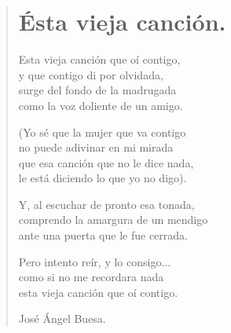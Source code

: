 \documentclass[11pt, portrait, twoside, notitlepage, openright]{book}
\begin{document}
\newpage
\begin{verse}
\begin{center}
\section{Ésta vieja canción.}
\end{center}
Esta vieja canción que oí contigo,\\
y que contigo di por olvidada,\\
surge del fondo de la madrugada\\
como la voz doliente de un amigo.
\newline

(Yo sé que la mujer que va contigo\\
no puede adivinar en mi mirada\\
que esa canción que no le dice nada,\\
le está diciendo lo que yo no digo).
\newline

Y, al escuchar de pronto esa tonada,\\
comprendo la amargura de un mendigo\\
ante una puerta que le fue cerrada.
\newline

Pero intento reír, y lo consigo...\\
como si no me recordara nada\\
esta vieja canción que oí contigo.
\newline

José Ángel Buesa.
\end{verse}
\end{document}
